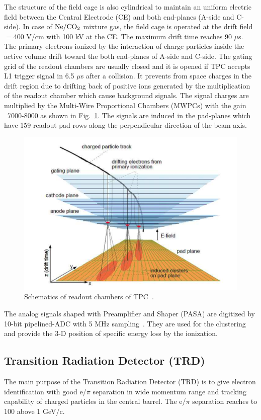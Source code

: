 The structure of the field cage is also cylindrical to maintain an uniform electric field between the Central Electrode (CE) and both end-planes (A-side and C-side).
In case of $\rm{Ne/CO_{2}}$ mixture gas, the field cage is operated at the drift field$=$400 V/cm with 100 kV at the CE. 
The maximum drift time reaches 90 $\mu$s.
The primary electrons ionized by the interaction of charge particles inside the active volume drift toward the both end-planes of A-side and C-side.
The gating grid of the readout chambers are usually closed and it is opened if TPC accepts L1 trigger signal in 6.5 $\mu$s after a collision.
It prevents from space charges in the drift region due to drifting back of positive ions generated by the multiplication of the readout chamber which cause background signals. 
The signal charges are multiplied by the Multi-Wire Proportional Chambers (MWPCs) with the gain ~7000-8000 as shown in Fig.~\ref{fig_3_tpcchamber}. 
The signals are induced in the pad-planes which have 159 readout pad rows along the perpendicular direction of the beam axis.
\begin{figure}[!h]
  \centering
  \includegraphics[width=12cm]{chap3/figure/TPC/Schematics_MWPCs.png}
  \caption{Schematics of readout chambers of TPC~\cite{bib_tpctdr}.}
  \label{fig_3_tpcchamber}
\end{figure}
The analog signals shaped with Preamplifier and Shaper (PASA) are digitized by 10-bit pipelined-ADC with 5 MHz sampling~\cite{bib_pasa}. 
They are used for the clustering and provide the 3-D position of specific energy loss by the ionization. 

\subsection{Transition Radiation Detector (TRD)}
\label{sec_3_trd}
The main purpose of the Transition Radiation Detector (TRD) is to give electron identification with good e/$\pi$ separation in wide momentum range and tracking capability of charged particles in the central barrel.
The e/$\pi$ separation reaches to 100 above 1 GeV/c. 

